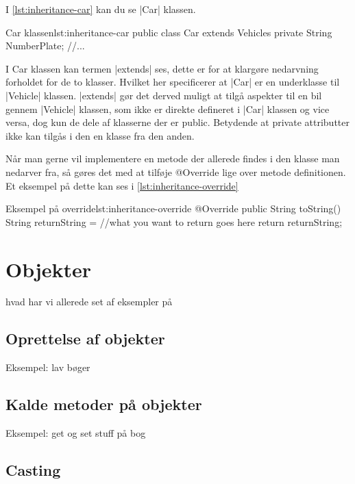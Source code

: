 I \autoref{lst:inheritance-car} kan du se \JavaInline|Car| klassen.

\begin{JavaCode}{Car klassen}{lst:inheritance-car}
	public class Car extends Vehicles
	{
		private String NumberPlate;
		//...
	}
\end{JavaCode}

I Car klassen kan termen \JavaInline|extends| ses, dette er for at klargøre nedarvning forholdet for de to klasser. Hvilket her specificerer at \JavaInline|Car| er en underklasse til \JavaInline|Vehicle| klassen. \JavaInline|extends| gør det derved muligt at tilgå aspekter til en bil gennem \JavaInline|Vehicle| klassen, som ikke er direkte defineret i \JavaInline|Car| klassen og vice versa, dog kun de dele af klasserne der er public. Betydende at private attributter ikke kan tilgås i den en klasse fra den anden.

Når man gerne vil implementere en metode der allerede findes i den klasse man nedarver fra, så gøres det med at tilføje @Override lige over metode definitionen. Et eksempel på dette kan ses i \autoref{lst:inheritance-override}

\begin{JavaCode}{Eksempel på override}{lst:inheritance-override}
	@Override
	public String toString() {
		String returnString = //what you want to return goes here
		return returnString;
	}
\end{JavaCode}

\section{Objekter}

hvad har vi allerede set af eksempler på

\subsection{Oprettelse af objekter}

Eksempel: lav bøger

\subsection{Kalde metoder på objekter}

Eksempel: get og set stuff på bog

\subsection{Casting}

